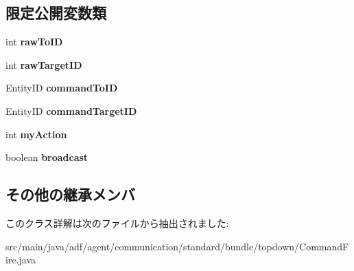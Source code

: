 \subsection*{限定公開変数類}
\begin{DoxyCompactItemize}
\item 
\hypertarget{classadf_1_1agent_1_1communication_1_1standard_1_1bundle_1_1topdown_1_1CommandFire_a9dc1206054fe357c2d4f70f56ed4317d}{}\label{classadf_1_1agent_1_1communication_1_1standard_1_1bundle_1_1topdown_1_1CommandFire_a9dc1206054fe357c2d4f70f56ed4317d} 
int {\bfseries raw\+To\+ID}
\item 
\hypertarget{classadf_1_1agent_1_1communication_1_1standard_1_1bundle_1_1topdown_1_1CommandFire_a0aa5fc09c19fca117a0f56ecff606e9b}{}\label{classadf_1_1agent_1_1communication_1_1standard_1_1bundle_1_1topdown_1_1CommandFire_a0aa5fc09c19fca117a0f56ecff606e9b} 
int {\bfseries raw\+Target\+ID}
\item 
\hypertarget{classadf_1_1agent_1_1communication_1_1standard_1_1bundle_1_1topdown_1_1CommandFire_a7638a069bac5b762afe9124c052b5e56}{}\label{classadf_1_1agent_1_1communication_1_1standard_1_1bundle_1_1topdown_1_1CommandFire_a7638a069bac5b762afe9124c052b5e56} 
Entity\+ID {\bfseries command\+To\+ID}
\item 
\hypertarget{classadf_1_1agent_1_1communication_1_1standard_1_1bundle_1_1topdown_1_1CommandFire_abfb8caea8fbc5dee3b0369e74fdb4be6}{}\label{classadf_1_1agent_1_1communication_1_1standard_1_1bundle_1_1topdown_1_1CommandFire_abfb8caea8fbc5dee3b0369e74fdb4be6} 
Entity\+ID {\bfseries command\+Target\+ID}
\item 
\hypertarget{classadf_1_1agent_1_1communication_1_1standard_1_1bundle_1_1topdown_1_1CommandFire_a37ec07982370fe310434d3b50d368b8a}{}\label{classadf_1_1agent_1_1communication_1_1standard_1_1bundle_1_1topdown_1_1CommandFire_a37ec07982370fe310434d3b50d368b8a} 
int {\bfseries my\+Action}
\item 
\hypertarget{classadf_1_1agent_1_1communication_1_1standard_1_1bundle_1_1topdown_1_1CommandFire_a46eb557d1d645390bc21d02676adbd59}{}\label{classadf_1_1agent_1_1communication_1_1standard_1_1bundle_1_1topdown_1_1CommandFire_a46eb557d1d645390bc21d02676adbd59} 
boolean {\bfseries broadcast}
\end{DoxyCompactItemize}
\subsection*{その他の継承メンバ}


このクラス詳解は次のファイルから抽出されました\+:\begin{DoxyCompactItemize}
\item 
src/main/java/adf/agent/communication/standard/bundle/topdown/Command\+Fire.\+java\end{DoxyCompactItemize}
